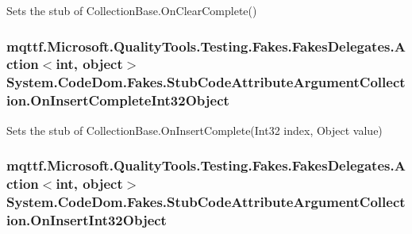 Sets the stub of Collection\-Base.\-On\-Clear\-Complete()

\hypertarget{class_system_1_1_code_dom_1_1_fakes_1_1_stub_code_attribute_argument_collection_a17b38add626f6d797ac884a174117497}{
\subsubsection[{On\-Insert\-Complete\-Int32\-Object}]{\setlength{\rightskip}{0pt plus 5cm}mqttf.\-Microsoft.\-Quality\-Tools.\-Testing.\-Fakes.\-Fakes\-Delegates.\-Action$<$int, object$>$ System.\-Code\-Dom.\-Fakes.\-Stub\-Code\-Attribute\-Argument\-Collection.\-On\-Insert\-Complete\-Int32\-Object}}\label{class_system_1_1_code_dom_1_1_fakes_1_1_stub_code_attribute_argument_collection_a17b38add626f6d797ac884a174117497}


Sets the stub of Collection\-Base.\-On\-Insert\-Complete(\-Int32 index, Object value)

\hypertarget{class_system_1_1_code_dom_1_1_fakes_1_1_stub_code_attribute_argument_collection_a32ad123b7c6c15093f5008477da33c6e}{
\subsubsection[{On\-Insert\-Int32\-Object}]{\setlength{\rightskip}{0pt plus 5cm}mqttf.\-Microsoft.\-Quality\-Tools.\-Testing.\-Fakes.\-Fakes\-Delegates.\-Action$<$int, object$>$ System.\-Code\-Dom.\-Fakes.\-Stub\-Code\-Attribute\-Argument\-Collection.\-On\-Insert\-Int32\-Object}}\label{class_system_1_1_code_dom_1_1_fakes_1_1_stub_code_attribute_argument_collection_a32ad123b7c6c15093f5008477da33c6e}


